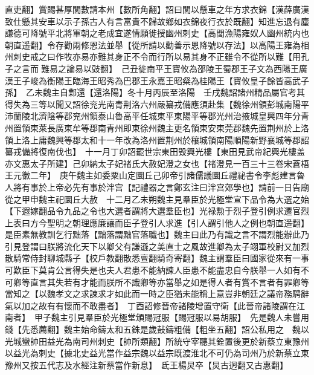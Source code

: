 直吏翻】賞賜甚厚閭數請本州【數所角翻】詔曰閭以懸車之年方求衣錦【漢薛廣漢致仕懸其安車以示子孫古人有言富貴不歸故鄉如衣錦夜行衣於既翻】知進忘退有塵謙德可降號平北將軍朝之老成宜遂情願徙授幽州刺史【高閭漁陽雍奴人幽州統内也朝直遥翻】令存勸兩修恩法並舉【從所請以勸善示恩降號以存法】以高陽王雍為相州刺史戒之曰作牧亦易亦難其身正不令而行所以易其身不正雖令不從所以難【用孔子之言而難易之論易以豉翻】　己丑徙南平王寶攸為邵陵王蜀郡王子文為西陽王廣漢王子峻為衡陽王臨海王昭秀為巴郡王永嘉王昭粲為桂陽王【寶攸皇子餘皆高武子孫】　乙未魏主自鄴還【還洛陽】冬十月丙辰至洛陽　壬戌魏詔諸州精品屬官考其得失為三等以聞又詔徐兖光南青荆洛六州嚴纂戎備應須赴集【魏徐州領彭城南陽平沛蘭陵北濟陰等郡兖州領泰山魯高平任城東平東陽平等郡光州治掖城皇興四年分青州置領東萊長廣東牟等郡南青州即東徐州魏主更名領東安東莞郡魏先置荆州於上洛領上洛上庸魏興等郡太和十一年改為洛州置荆州於穰城領南陽順陽新野襄城等郡詔纂戎備將復南伐也】　十一月丁卯詔罷世宗東田毁興光樓【東田見武帝紀興光樓盖亦文惠太子所建】己卯納太子妃禇氏大赦妃澄之女也【禇澄見一百三十三卷宋蒼梧王元徽二年】　庚午魏主如委粟山定圜丘己卯帝引諸儒議圜丘禮祕書令李彪建言魯人將有事於上帝必先有事於泮宫【記禮器之言鄭玄注曰泮宫郊學也】請前一日告廟從之甲申魏主祀圜丘大赦　十二月乙未朔魏主見羣臣於光極堂宣下品令為大選之始【下遐嫁翻品令九品之令也大選者謂將大選羣臣也】光禄勲于烈子登引例求遷官烈上表曰方今聖明之朝理應廉讓而臣子登引人求進【引人謂引他人之例也朝直遥翻】是臣素無教訓乞行黜落【黜落謂黜官落職也】魏主曰此乃有識之言不謂烈能辦此乃引見登謂曰朕將流化天下以卿父有謙遜之美直士之風故進卿為太子翊軍校尉又加烈散騎常侍封聊城縣子【校戶教翻散悉亶翻騎奇寄翻】魏主謂羣臣曰國家從來有一事可歎臣下莫肯公言得失是也夫人君患不能納諫人臣患不能盡忠自今朕舉一人如有不可卿等直言其失若有才能而朕所不識卿等亦當舉之如是得人者有賞不言者有罪卿等當知之【以魏孝文之求諫求才如此而一時之臣猶未能稱上意豈非朝廷之議帝務騁辭氣以加之故有有懷而不敢盡者】　丁酉詔修晉帝諸陵增置守衛【此晉帝諸陵謂在江南者】　甲子魏主引見羣臣於光極堂頒賜冠服【賜冠服以易胡服】　先是魏人未嘗用錢【先悉薦翻】魏主始命鑄太和五銖是歲鼔鑄粗備【粗坐五翻】詔公私用之　魏以光城蠻帥田益光為南司州刺史【帥所類翻】所統守宰聽其銓置後更於新蔡立東豫州以益光為刺史【據北史益光當作益宗魏以益宗既渡淮北不可仍為司州乃於新蔡立東豫州又按五代志及水經注新蔡當作新息】　氐王楊炅卒【炅古迥翻又古惠翻】

